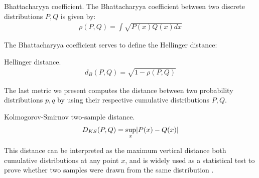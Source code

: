 \documentclass[../main.tex]{subfiles}
\begin{document}
\begin{definition}{Bhattacharyya coefficient.} \label{def_bhattacharyyacoef}
The Bhattacharyya coefficient between two discrete distributions $P, Q$ is given by:
\begin{align*}
\rho(P, Q) = \int{\sqrt{P(x)Q(x)dx}}
\end{align*}
\end{definition}
\par The Bhattacharyya coefficient serves to define the Hellinger distance:
\begin{definition}{Hellinger distance.} \label{def_bhattacharyya}
\begin{align*}
d_B(P, Q) = \sqrt{1 - \rho(P, Q)}
\end{align*}
\end{definition}

\par The last metric we present computes the distance between two probability distributions $p, q$ by using their respective cumulative distributions $P, Q$.
\begin{definition}{Kolmogorov-Smirnov two-sample distance.} \label{def_ks2s}
\begin{align*}
D_{KS}(P, Q) = \sup_{x}\lvert P(x)-Q(x)\rvert
\end{align*}
\end{definition}
\par This distance can be interpreted as the maximum vertical distance both cumulative distributions at any point $x$, and is widely used as a statistical test to prove whether two samples were drawn from the same distribution \cite{KSMathworks2015}.
\end{document}
